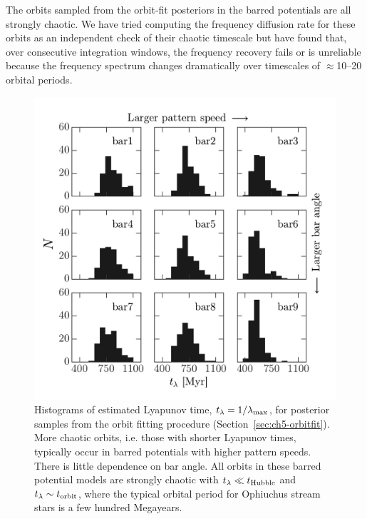 The orbits sampled from the orbit-fit posteriors in the barred potentials are
all strongly chaotic. We have tried computing the frequency diffusion rate for
these orbits as an independent check of their chaotic timescale but have found
that, over consecutive integration windows, the frequency recovery fails or is
unreliable because the frequency spectrum changes dramatically over timescales
of $\approx$10--20 orbital periods.

\begin{figure}[!th]
\begin{center}
\includegraphics[width=\textwidth]{figures/ch4/lyapunov-hist}
\caption{ Histograms of estimated Lyapunov time, $t_\lambda=1/\lambda_{\rm max}$, for
posterior samples from the orbit fitting procedure (Section~\ref{sec:ch5-orbitfit}).
More chaotic orbits, i.e. those with shorter Lyapunov times, typically occur in
barred potentials with higher pattern speeds. There is little dependence on bar
angle. All orbits in these barred potential models are strongly chaotic with
$t_\lambda \ll t_{\rm Hubble}$ and $t_\lambda \sim t_{\rm orbit}$, where the
typical orbital period for Ophiuchus stream stars is a few hundred Megayears.}
\label{fig:lyapunov-hist}
\end{center}
\end{figure}

